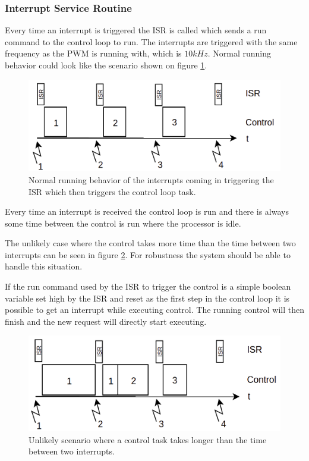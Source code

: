 \subsubsection{Interrupt Service Routine}
\label{sec:isr}
Every time an interrupt is triggered the ISR is called which sends a run command to the control loop to run. The interrupts are triggered with the same frequency as the PWM is running with, which is $10kHz$. Normal running behavior could look like the scenario shown on figure \ref{fig:isr1}. 

\begin{figure}[H]
	\centering
	\includegraphics[width=0.65\linewidth]{pictures/software/isr/isr1.png}
	\caption{Normal running behavior of the interrupts coming in triggering the ISR which then triggers the control loop task.}
	\label{fig:isr1}
\end{figure}

Every time an interrupt is received the control loop is run and there is always some time between the control is run where the processor is idle.


The unlikely case where the control takes more time than the time between two interrupts can be seen in figure \ref{fig:isr2}. For robustness the system should be able to handle this situation. 

If the run command used by the ISR to trigger the control is a simple boolean variable set high by the ISR and reset as the first step in the control loop it is possible to get an interrupt while executing control. The running control will then finish and the new request will directly start executing.

\begin{figure}[H]
	\centering
	\includegraphics[width=0.65\linewidth]{pictures/software/isr/isr2.png}
	\caption{Unlikely scenario where a control task takes longer than the time between two interrupts.}
	\label{fig:isr2}
\end{figure}


